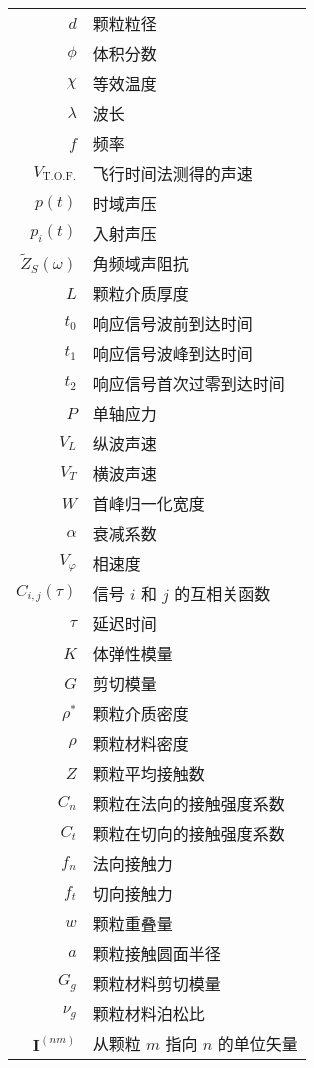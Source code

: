
\begin{nomenclature*}
\label{chap:symb}

\begin{longtable}{rl}
  $d$  & 颗粒粒径 \\  
  $\phi$ & 体积分数 \\
  $\chi$ & 等效温度 \\
  $\lambda$ & 波长 \\
  $f$ & 频率 \\
  $V_{\text{T.O.F.}}$ & 飞行时间法测得的声速\\
  $p(t)$ & 时域声压\\
  $p_{i}(t)$ & 入射声压\\
  $\widetilde{Z}_{S}(\omega)$ & 角频域声阻抗\\
  $L$ & 颗粒介质厚度\\
  $t_{0}$ & 响应信号波前到达时间\\
  $t_{1}$ & 响应信号波峰到达时间\\
  $t_{2}$ & 响应信号首次过零到达时间\\
  $P$ & 单轴应力\\
  $V_{L}$ & 纵波声速\\
  $V_{T}$ & 横波声速\\
  $W$ & 首峰归一化宽度\\
  $\alpha$ & 衰减系数\\
  $V_{\varphi}$ & 相速度\\
  $C_{i,j}(\tau)$ & 信号 $i$ 和 $j$ 的互相关函数\\
  $\tau$ & 延迟时间\\
  $K$ & 体弹性模量\\
  $G$ & 剪切模量\\
  $\rho^{*}$ & 颗粒介质密度\\
  $\rho$ & 颗粒材料密度\\
  $Z$ & 颗粒平均接触数\\
  $C_{n}$ & 颗粒在法向的接触强度系数\\
  $C_{t}$ & 颗粒在切向的接触强度系数\\
  $f_{n}$ & 法向接触力\\
  $f_{t}$ & 切向接触力\\
  $w$ & 颗粒重叠量\\
  $a$ & 颗粒接触圆面半径\\
  $G_{g}$ & 颗粒材料剪切模量\\
  $\nu_{g}$ & 颗粒材料泊松比\\
  $\mathbf{I}^{(nm)}$ & 从颗粒 $m$ 指向 $n$ 的单位矢量\\

\end{longtable}
\end{nomenclature*}

